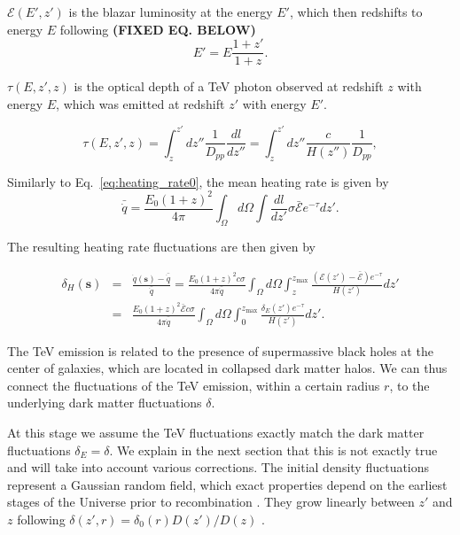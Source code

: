 \documentclass[twocolumns]{emulateapj}
\newcommand\Ec[1]{{\color{magenta} \bf #1}} %
\begin{document}
$\mathcal{E}(E',z')$ is  the   blazar luminosity at the energy $E'$,  which then redshifts to energy $E$ following \Ec{(FIXED EQ. BELOW)}
\begin{equation}
  \label{eq:E_z}
  E'=E\frac{1+z'}{1+z}.
\end{equation}

$\tau(E,z',z)$ is the optical depth of a TeV photon observed at redshift $z$ with energy $E$, which was emitted at redshift $z'$ with energy $E'$.

\begin{equation}
  \label{eq:tau}
  \tau(E,z',z)=\int_z^{z'}dz''\frac{1}{D_{pp}}\frac{dl}{dz''}=\int_z^{z'}dz''\frac{c}{H(z'')}\frac{1}{D_{pp}},
\end{equation}



Similarly to Eq.~\eqref{eq:heating_rate0},  the mean heating rate is given by 
\begin{equation}
  \label{eq:mean_exp_heat}
  \bar{\dot{q}}=\frac{E_0(1+z)^2}{4\pi}\int_{\Omega}d\Omega\int \frac{dl}{dz'}\sigma\bar{\mathcal{E}} e^{-\tau}dz'.
\end{equation}


The resulting heating rate fluctuations are then given by

\begin{eqnarray}
  \label{eq:fluc_exp0}
  \delta_H(\mathbf{s})&=&\frac{\dot{q}(\mathbf{s})-\bar{\dot{q}}}{\bar{\dot{q}}}=\frac{E_0(1+z)^2c\sigma}{4\pi\bar{\dot{q}}} \int_{\Omega}d\Omega\int_z^{z_{\mathrm{max}}} \frac{ ( \mathcal{E}(z')-\bar{\mathcal{E}})  e^{-\tau}}{H(z')} dz' \\ \nonumber
  &=&\frac{E_0(1+z)^2\bar{\mathcal{E}} c\sigma}{4\pi\bar{\dot{q}}}  \int_{\Omega}d\Omega\int_0^{z_{\mathrm{max}}}   \frac{\delta_E(z')  e^{-\tau}}{H(z')}dz'.
\end{eqnarray}

The TeV emission is related to the presence of supermassive black holes at the center of galaxies, which are located in collapsed dark matter halos.  We can thus connect the fluctuations of the TeV emission, within a certain radius $r$, to the underlying dark matter fluctuations $\delta$.

At this stage we assume the TeV fluctuations exactly match the dark matter fluctuations $\delta_E=\delta$.  We explain in the next section that this is not exactly true and will take into account various corrections.  The initial density fluctuations represent a Gaussian random field, which exact properties depend on the earliest stages of the Universe prior to recombination \citep{1986ApJ...304...15B,Peebles}. They grow linearly between $z'$ and $z$ following $\delta(z',r)=\delta_0(r)D(z')/D(z)$ \citep{ 1977MNRAS.179..351H}.
\end{document}
